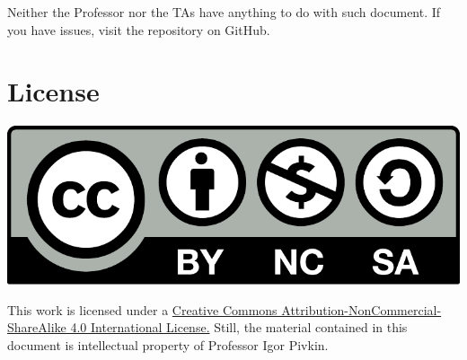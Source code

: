Neither the Professor nor the TAs have anything to do with such document. If you have issues, visit the repository on GitHub.

	


\section*{License}
\begin{center}
\includegraphics[scale=0.35]{Other/logo.pdf}
\end{center}
This work is licensed under a \href{http://creativecommons.org/licenses/by-nc-sa/4.0/}{Creative Commons Attribution-NonCommercial-ShareAlike 4.0 International License.} Still, the material contained in this document is intellectual property of Professor Igor Pivkin.
